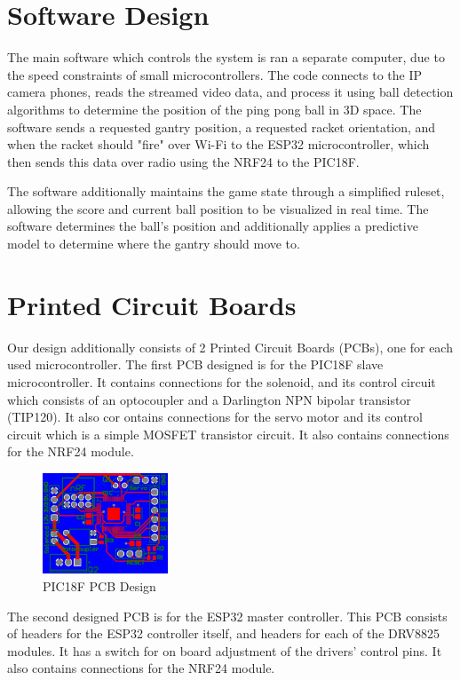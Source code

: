 \section{Software Design}
The main software which controls the system is ran a separate computer, due to the speed constraints of small microcontrollers. The code connects to the IP camera phones, reads the streamed video data, and process it using ball detection algorithms to determine the position of the ping pong ball in 3D space. The software sends a requested gantry position, a requested racket orientation, and when the racket should "fire" over Wi-Fi to the ESP32 microcontroller, which then sends this data over radio using the NRF24 to the PIC18F.

The software additionally maintains the game state through a simplified ruleset, allowing the score and current ball position to be visualized in real time. The software determines the ball's position and additionally applies a predictive model to determine where the gantry should move to.


\section{Printed Circuit Boards}

Our design additionally consists of 2 Printed Circuit Boards (PCBs), one for each used microcontroller. The first PCB designed is for the PIC18F slave microcontroller. It contains connections for the solenoid, and its control circuit which consists of an optocoupler and a Darlington NPN bipolar transistor (TIP120). It also cor ontains connections for the servo motor and its control circuit which is a simple MOSFET transistor circuit. It also contains connections for the NRF24 module.

\begin{figure}[h]
	\centering\includegraphics[height=3cm]{./images/picpcb}
	\caption{PIC18F PCB Design}
\end{figure}

The second designed PCB is for the ESP32 master controller. This PCB consists of headers for the ESP32 controller itself, and headers for each of the DRV8825 modules. It has a switch for on board adjustment of the drivers' control pins. It also contains connections for the NRF24 module.

